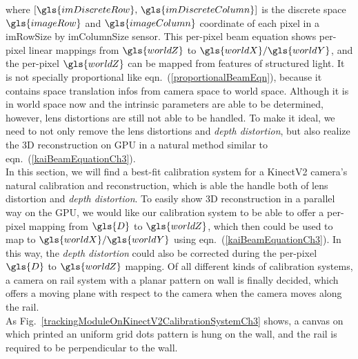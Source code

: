 where \([\gls{imDiscreteRow}, \, \gls{imDiscreteColumn}] \) is the discrete space \(\gls{imageRow}\) and \(\gls{imageColumn}\) coordinate of each pixel in a \gls{imRowSize} by \gls{imColumnSize} sensor. This per-pixel beam equation shows per-pixel linear mappings from \(\gls{worldZ}\) to \(\gls{worldX}/\gls{worldY}\), and the per-pixel \(\gls{worldZ}\) can be mapped from features of structured light. It is not specially proportional like eqn.~(\ref{proportionalBeamEqn}), because it contains space translation infos from camera space to world space. Although it is in world space now and the intrinsic parameters are able to be determined, however, lens distortions are still not able to be handled. To make it ideal, we need to not only remove the lens distortions and \emph{depth distortion}, but also realize the \gls{3D} reconstruction on \gls{GPU} in a natural method similar to eqn.~(\ref{kaiBeamEquationCh3}).
\\\indent
%
In this section, we will find a best-fit calibration system for a \gls{KinectV2} camera's natural calibration and reconstruction, which is able the handle both of lens distortion and \emph{depth distortion}. %
To easily show \gls{3D} reconstruction in a parallel way on the \gls{GPU}, we would like our calibration system to be able to offer a per-pixel mapping from \(\gls{D}\) to \(\gls{worldZ}\), which then could be used to map to \(\gls{worldX}/\gls{worldY}\) using eqn.~(\ref{kaiBeamEquationCh3}). In this way, the \emph{depth distortion} could also be corrected during the per-pixel \(\gls{D}\) to \(\gls{worldZ}\) mapping. Of all different kinds of calibration systems, a camera on rail system with a planar pattern on wall is finally decided, which offers a moving plane with respect to the camera when the camera moves along the rail. %
\\\indent
As Fig.~\ref{trackingModuleOnKinectV2CalibrationSystemCh3} shows, a canvas on which printed an uniform grid dots pattern is hung on the wall, and the rail is required to be perpendicular to the wall. 
